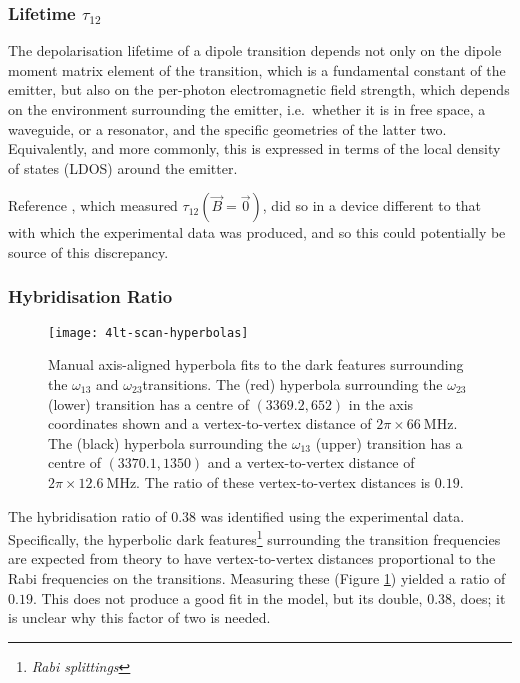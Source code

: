 \subsubsection{Lifetime $\tau_{12}$}
The depolarisation lifetime of a dipole transition depends not only on the dipole moment matrix element of the transition, which is a fundamental constant of the emitter, but also on the per-photon electromagnetic field strength, which depends on the environment surrounding the emitter, i.e.\ whether it is in free space, a waveguide, or a resonator, and the specific geometries of the latter two. Equivalently, and more commonly, this is expressed in terms of the local density of states (LDOS) around the emitter.

Reference \cite{kindem_control_2020}, which measured $\tau_{12}(\vec{B}=\vec{0})$, did so in a device different to that with which the experimental data was produced, and so this could potentially be source of this discrepancy.

\subsubsection{Hybridisation Ratio}
\begin{figure}[h]
\centering
\texttt{[image: 4lt-scan-hyperbolas]}
\caption{\label{fig:4lt_scan_hyperbolas} Manual axis-aligned hyperbola fits to the dark features surrounding the $\omega_{13}$ and $\omega_{23} $transitions. The (red) hyperbola surrounding the $\omega_{23}$ (lower) transition has a centre of $(3369.2, 652)$ in the axis coordinates shown and a vertex-to-vertex distance of $2\pi \times \qty{66}{\mega\hertz}$. The (black) hyperbola surrounding the $\omega_{13}$ (upper) transition has a centre of $(3370.1, 1350)$ and a vertex-to-vertex distance of $2\pi \times \qty{12.6}{\mega\hertz}$. The ratio of these vertex-to-vertex distances is $\num{0.19}$.}
\end{figure}

\noindent The hybridisation ratio of $\num{0.38}$ was identified using the experimental data. Specifically, the hyperbolic dark features\footnote{\textit{Rabi splittings}} surrounding the transition frequencies are expected from theory to have vertex-to-vertex distances proportional to the Rabi frequencies on the transitions\cite{baur_2009}. Measuring these (Figure \ref{fig:4lt_scan_hyperbolas}) yielded a ratio of $\num{0.19}$. This does not produce a good fit in the model, but its double, $\num{0.38}$, does; it is unclear why this factor of two is needed.


